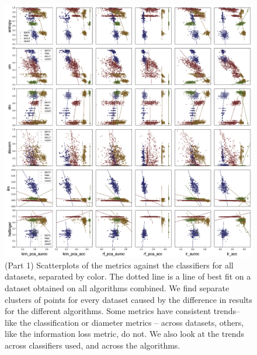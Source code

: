 \begin{figure}
    \centerfloat
    \includegraphics[width=1.2\textwidth]{project/fig/metrics-vs-accs_1.png}
    \caption{(Part 1) Scatterplots of the metrics against the classifiers for all datasets, separated by color. The dotted line is a line of best fit on a dataset obtained on all algorithms combined. We find separate clusters of points for every dataset caused by the difference in results for the different algorithms. Some metrics have consistent trends-- like the classification or diameter metrics -- across datasets, others, like the information loss metric, do not. We also look at the trends across classifiers used, and across the algorithms.}
    \label{fig:metrics_scatter1}
\end{figure}
